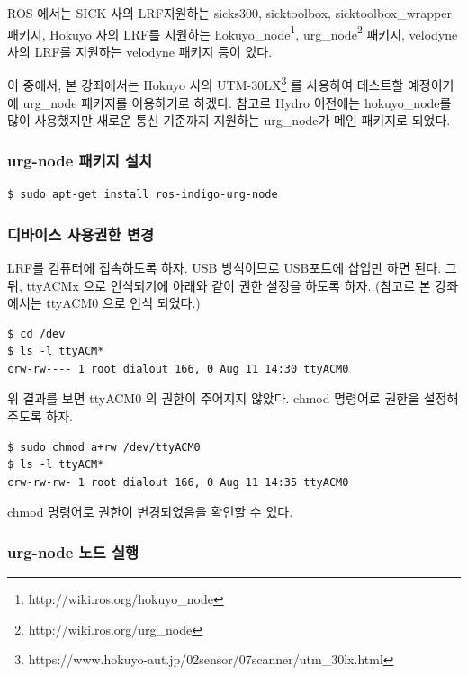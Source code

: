 ROS 에서는 SICK 사의 LRF지원하는 sicks300, sicktoolbox, sicktoolbox\_wrapper 패키지, Hokuyo 사의 LRF를 지원하는 hokuyo\_node\footnote{http://wiki.ros.org/hokuyo\_node}, urg\_node\footnote{http://wiki.ros.org/urg\_node} 패키지, velodyne 사의 LRF를 지원하는 velodyne 패키지 등이 있다.

이 중에서, 본 강좌에서는 Hokuyo 사의 UTM-30LX\footnote{https://www.hokuyo-aut.jp/02sensor/07scanner/utm\_30lx.html} 를 사용하여 테스트할 예정이기에 urg\_node 패키지를 이용하기로 하겠다. 참고로 Hydro 이전에는 hokuyo\_node를 많이 사용했지만 새로운 통신 기준까지 지원하는 urg\_node가 메인 패키지로 되었다.

\subsubsection{urg-node 패키지 설치}

\begin{lstlisting}[language=ROS]
$ sudo apt-get install ros-indigo-urg-node 
\end{lstlisting}

\subsubsection{디바이스 사용권한 변경}

LRF를 컴퓨터에 접속하도록 하자. USB 방식이므로 USB포트에 삽입만 하면 된다. 그 뒤, ttyACMx 으로 인식되기에 아래와 같이 권한 설정을 하도록 하자. (참고로 본 강좌에서는 ttyACM0 으로 인식 되었다.)

\begin{lstlisting}[language=ROS]
$ cd /dev
$ ls -l ttyACM*
crw-rw---- 1 root dialout 166, 0 Aug 11 14:30 ttyACM0
\end{lstlisting}

위 결과를 보면 ttyACM0 의 권한이 주어지지 않았다. chmod 명령어로 권한을 설정해 주도록 하자.

\begin{lstlisting}[language=ROS]
$ sudo chmod a+rw /dev/ttyACM0
$ ls -l ttyACM*
crw-rw-rw- 1 root dialout 166, 0 Aug 11 14:35 ttyACM0
\end{lstlisting}

\noindent
chmod 명령어로 권한이 변경되었음을 확인할 수 있다.

\subsubsection{urg-node 노드 실행}

